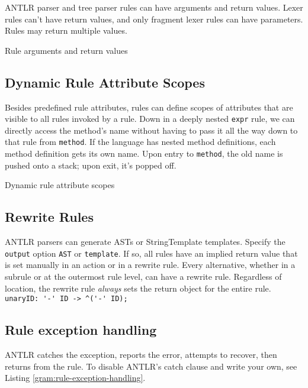 ANTLR parser and tree parser rules can have arguments and return values.
Lexer rules can't have return values,
and only fragment lexer rules can have parameters.
Rules may return multiple values.

\begin{program}
\caption{Rule arguments and return values\label{gram:rule-args-retvals}}
\end{program}


\subsection{Dynamic Rule Attribute Scopes}

Besides predefined rule attributes, rules can define scopes of attributes
that are visible to all rules invoked by a rule.
Down in a deeply nested \verb=expr= rule,
we can directly access the method's name
without having to pass it all the way down to that rule from \verb=method=.
If the language has nested method definitions,
each method definition gets its own name.
Upon entry to \verb=method=, the old name is pushed onto a stack;
upon exit, it's popped off.

\begin{program}
\caption{Dynamic rule attribute scopes\label{gram:dynamic-rule-attr-scope}}
\end{program}


\subsection{Rewrite Rules}

ANTLR parsers can generate ASTs or StringTemplate templates.
Specify the \verb=output= option \verb=AST= or \verb=template=.
If so, all rules have an implied return value
that is set manually in an action or in a rewrite rule.
Every alternative, whether in a subrule or at the outermost rule level,
can have a rewrite rule.
Regardless of location,
the rewrite rule \emph{always} sets the return object for the entire rule.\\
\verb_unaryID: '-' ID -> ^('-' ID);_


\subsection{Rule exception handling}
ANTLR catches the exception, reports the error, attempts to recover,
then returns from the rule.
To disable ANTLR's catch clause and write your own,
see Listing \ref{gram:rule-exception-handling}.

